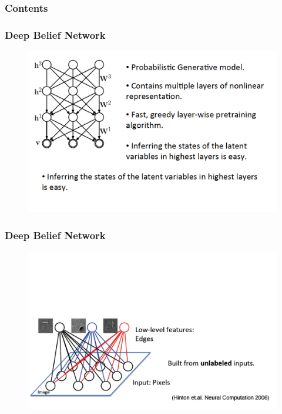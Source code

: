 \documentclass{beamer}
\begin{document}
\begin{frame}
  \frametitle{Contents}
  \tableofcontents[currentsection]
\end{frame}

\begin{frame}
\frametitle{Deep Belief Network}
\begin{figure}
      \includegraphics[width=1\textwidth]{figs/rbm22.png}
\end{figure}
\end{frame}

\begin{frame}
\frametitle{Deep Belief Network}
\begin{figure}
      \includegraphics[width=1\textwidth]{figs/rbm23.png}
\end{figure}
\end{frame}
\end{document}
